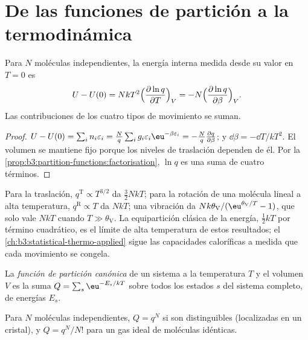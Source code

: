 \section{De las funciones de partición a la termodinámica}

\begin{theorem}\label{thm:b3:partition-functions:internal-energy}
Para $N$ moléculas independientes, la energía interna medida desde su valor en
$T = 0$ es
\[
  U - U(0) = NkT^2\Bigl(\frac{\partial\ln q}{\partial T}\Bigr)_V
          = -N\Bigl(\frac{\partial\ln q}{\partial\beta}\Bigr)_V .
\]
Las contribuciones de los cuatro tipos de movimiento se suman.
\end{theorem}

\begin{proof}
$U - U(0) = \sum_in_i\varepsilon_i = \frac Nq\sum_ig_i\varepsilon_i\eu^{-\beta\varepsilon_i} = -\frac Nq\frac{\partial q}{\partial\beta}$;
y $\dd\beta = -\dd T/kT^2$. El volumen se mantiene fijo porque los niveles de traslación
dependen de él. Por la \cref{prop:b3:partition-functions:factorisation}, $\ln q$ es una
suma de cuatro términos.
\end{proof}

Para la traslación, $q^{\mathrm T} \propto T^{3/2}$ da $\frac32NkT$; para la rotación de una molécula
lineal a alta temperatura, $q^{\mathrm R} \propto T$ da $NkT$; una vibración da
$Nk\theta_{\mathrm V}/(\eu^{\theta_{\mathrm V}/T} - 1)$, que solo vale $NkT$ cuando $T \gg \theta_{\mathrm V}$. La
equipartición clásica de la energía, $\frac12kT$ por término cuadrático, es el
límite de alta temperatura de estos resultados; el \cref{ch:b3:statistical-thermo-applied}
sigue las capacidades caloríficas a medida que cada movimiento se congela.

\begin{definition}\label{def:b3:partition-functions:canonical}
La \emph{función de partición canónica} de un
sistema a la temperatura $T$ y el volumen $V$ es la suma $Q = \sum_s\eu^{-E_s/kT}$ sobre todos los
estados $s$ del sistema completo, de energías $E_s$.
\end{definition}

\begin{proposition}\label{prop:b3:partition-functions:canonical}
Para $N$ moléculas independientes, $Q = q^N$ si son distinguibles (localizadas en
un cristal), y $Q = q^N/N!$ para un gas ideal de moléculas idénticas.
\end{proposition}

